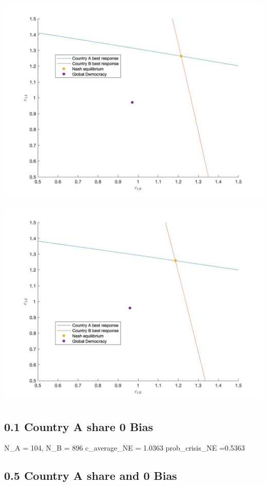 \documentclass[11pt,preprint, authoryear]{elsarticle}
\let\origfigure\figure
\let\endorigfigure\endfigure
\renewenvironment{figure}[1][2] {
    \expandafter\origfigure\expandafter[H]
} {
    \endorigfigure
}
\numberwithin{equation}{section}
\numberwithin{figure}{section}
\numberwithin{table}{section}
\begin{document}
\begin{figure}[H]

{\centering \includegraphics[width=0.45\linewidth]{images/Fig2_0.5Size0Bias} 

}

\caption{Nash equilibrium for 50/50 country split}\label{fig:unnamed-chunk-3}
\end{figure}

\begin{figure}[H]

{\centering \includegraphics[width=0.45\linewidth]{images/Fig2_0.5Size0.9Bias} 

}

\caption{Nash equilibrium for 0.9 bias for country A}\label{fig:unnamed-chunk-4}
\end{figure}

\hypertarget{country-a-share-0-bias}{%
\subsection*{0.1 Country A share 0 Bias}\label{country-a-share-0-bias}}

N\_A = 104, N\_B = 896 c\_average\_NE = 1.0363 prob\_crisis\_NE =0.5363

\hypertarget{country-a-share-and-0-bias}{%
\subsection*{0.5 Country A share and 0
Bias}\label{country-a-share-and-0-bias}}
\end{document}
